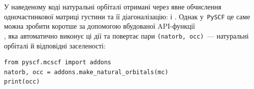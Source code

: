 \begin{commentbox}
	У наведеному коді натуральні орбіталі отримані
	через явне обчислення одночастинкової матриці густини
	та її діагоналізацію:
	 і .
	Однак у~\texttt{PySCF} це саме можна зробити коротше
	за допомогою вбудованої API-функції\\  ,
	яка автоматично виконує ці дії та повертає пари
	\texttt{(natorb, occ)}~--- натуральні орбіталі й відповідні заселеності:
	\begin{verbatim}
from pyscf.mcscf import addons
natorb, occ = addons.make_natural_orbitals(mc)
print(occ)
\end{verbatim}
\end{commentbox}



%

